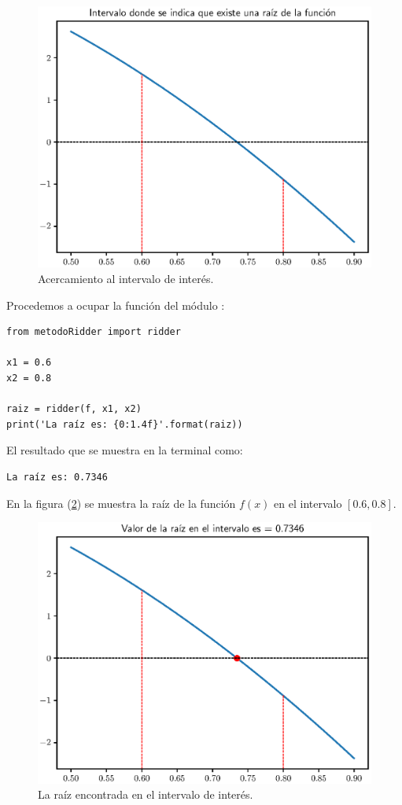 \begin{figure}[H]
    \centering
    \includegraphics[scale=0.75]{Imagenes/plot_Metodo_Ridder_Ejercicio_01_02.eps}
    \caption{Acercamiento al intervalo de interés.}
    \label{fig:figura_02}
\end{figure}
Procedemos a ocupar la función  del módulo :
\begin{verbatim}
from metodoRidder import ridder

x1 = 0.6
x2 = 0.8

raiz = ridder(f, x1, x2)
print('La raíz es: {0:1.4f}'.format(raiz))
\end{verbatim}

El resultado que se muestra en la terminal como:
\begin{verbatim}
La raíz es: 0.7346 
\end{verbatim}
 En la figura (\ref{fig:figura_03}) se muestra la raíz de la función $f (x)$ en el intervalo $[0.6, 0.8]$.
\begin{figure}[H]
    \centering
    \includegraphics[scale=0.75]{Imagenes/plot_Metodo_Ridder_Ejercicio_01_03.eps}
    \caption{La raíz encontrada en el intervalo de interés.}
    \label{fig:figura_03}
\end{figure}

